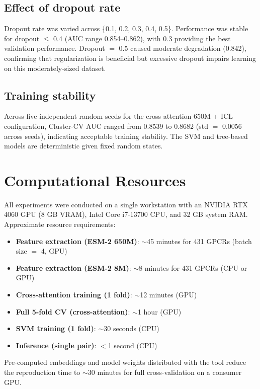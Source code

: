 \documentclass[11pt,a4paper]{article}
\begin{document}
\subsection{Effect of dropout rate}

Dropout rate was varied across \{0.1, 0.2, 0.3, 0.4, 0.5\}. Performance was stable for dropout $\le$ 0.4 (AUC range 0.854--0.862), with 0.3 providing the best validation performance. Dropout $=$ 0.5 caused moderate degradation (0.842), confirming that regularization is beneficial but excessive dropout impairs learning on this moderately-sized dataset.

\subsection{Training stability}

Across five independent random seeds for the cross-attention 650M + ICL configuration, Cluster-CV AUC ranged from 0.8539 to 0.8682 (std $=$ 0.0056 across seeds), indicating acceptable training stability. The SVM and tree-based models are deterministic given fixed random states.

\section{Computational Resources}

All experiments were conducted on a single workstation with an NVIDIA RTX 4060 GPU (8 GB VRAM), Intel Core i7-13700 CPU, and 32 GB system RAM. Approximate resource requirements:

\begin{itemize}
  \item \textbf{Feature extraction (ESM-2 650M)}: $\sim$45 minutes for 431 GPCRs (batch size $=$ 4, GPU)
  \item \textbf{Feature extraction (ESM-2 8M)}: $\sim$8 minutes for 431 GPCRs (CPU or GPU)
  \item \textbf{Cross-attention training (1 fold)}: $\sim$12 minutes (GPU)
  \item \textbf{Full 5-fold CV (cross-attention)}: $\sim$1 hour (GPU)
  \item \textbf{SVM training (1 fold)}: $\sim$30 seconds (CPU)
  \item \textbf{Inference (single pair)}: $<$1 second (CPU)
\end{itemize}

Pre-computed embeddings and model weights distributed with the tool reduce the reproduction time to $\sim$30 minutes for full cross-validation on a consumer GPU.
\end{document}
